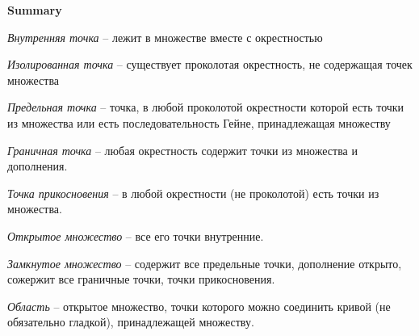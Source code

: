 \documentclass{article}
\newcommand{\bb}{\textbf}
\newcommand{\ii}{\textit}
\begin{document}
\begin{figure}[h!]
    \centering
    \vspace{-1cm}
\end{figure}
\begin{figure}[h!]
    \centering
    \vspace{-1cm}
\end{figure}
\newpage\noindent
\bb{Summary}

\ii{Внутренняя точка} -- лежит в множестве вместе с окрестностью

\ii{Изолированная точка} -- существует проколотая окрестность, не содержащая точек множества

\ii{Предельная точка} -- точка, в любой проколотой окрестности которой есть точки из множества или есть последовательность Гейне, принадлежащая множеству

\ii{Граничная точка} -- любая окрестность содержит точки из множества и дополнения.

\ii{Точка прикосновения} -- в любой окрестности (не проколотой) есть точки из множества.

\ii{Открытое множество} -- все его точки внутренние.

\ii{Замкнутое множество} -- содержит все предельные точки, дополнение открыто, сожержит все граничные точки, точки прикосновения.

\ii{Область} -- открытое множество, точки которого можно соединить кривой (не обязательно гладкой), принадлежащей множеству.
\end{document}
